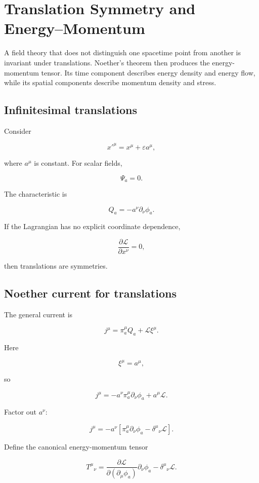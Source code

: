\section{Translation Symmetry and Energy--Momentum}
\label{sec:translation_energy_momentum}

A field theory that does not distinguish one spacetime point from another is invariant under translations. Noether's theorem then produces the energy-momentum tensor. Its time component describes energy density and energy flow, while its spatial components describe momentum density and stress.

\subsection{Infinitesimal translations}

Consider

\[
x'^{\mu}
=
x^{\mu}
+
\varepsilon a^{\mu},
\]

where \(a^{\mu}\) is constant. For scalar fields,

\[
\Psi_a=0.
\]

The characteristic is

\[
Q_a
=
-a^{\nu}\partial_{\nu}\phi_a.
\]

If the Lagrangian has no explicit coordinate dependence,

\[
\frac{\partial\mathcal{L}}
{\partial x^{\nu}}
=
0,
\]

then translations are symmetries.

\subsection{Noether current for translations}

The general current is

\[
j^{\mu}
=
\pi_a^{\mu}Q_a
+
\mathcal{L}\xi^{\mu}.
\]

Here

\[
\xi^{\mu}=a^{\mu},
\]

so

\[
j^{\mu}
=
-a^{\nu}
\pi_a^{\mu}\partial_{\nu}\phi_a
+
a^{\mu}\mathcal{L}.
\]

Factor out \(a^{\nu}\):

\[
j^{\mu}
=
-a^{\nu}
\left[
\pi_a^{\mu}\partial_{\nu}\phi_a
-
\delta^{\mu}{}_{\nu}\mathcal{L}
\right].
\]

Define the canonical energy-momentum tensor

\[
\boxed{
T^{\mu}{}_{\nu}
=
\frac{\partial\mathcal{L}}
{\partial(\partial_{\mu}\phi_a)}
\partial_{\nu}\phi_a
-
\delta^{\mu}{}_{\nu}\mathcal{L}
}.
\]

